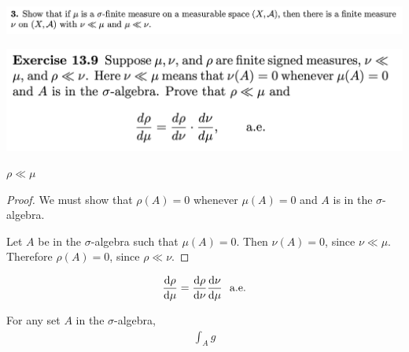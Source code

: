 \begin{mdframed}
\includegraphics[width=400pt]{img/analysis--berkeley-202a-hw11-3704.png}
\end{mdframed}


\begin{mdframed}
\includegraphics[width=400pt]{img/analysis--berkeley-202a-hw11-f2c0.png}
\end{mdframed}


\begin{claim*}
  $\rho \ll \mu$
\end{claim*}
\begin{proof}
  We must show that $\rho(A) = 0$ whenever $\mu(A) = 0$ and $A$ is in the $\sigma$-algebra.

  Let $A$ be in the $\sigma$-algebra such that $\mu(A) = 0$. Then $\nu(A) = 0$, since $\nu \ll \mu$.
  Therefore $\rho(A) = 0$, since $\rho \ll \nu$.
\end{proof}

\begin{claim*}
  \begin{align*}
    \frac{\d\rho}{\d\mu} = \frac{\d\rho}{\d\nu}\frac{\d\nu}{\d\mu} \ae
  \end{align*}
\end{claim*}

\begin{lemma}
  For any set $A$ in the $\sigma$-algebra,
  \begin{align*}
    \int_A g
  \end{align*}
\end{lemma}

